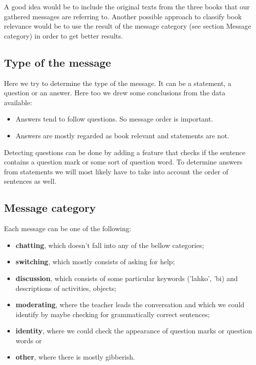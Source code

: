 \documentclass[11pt,a4paper]{article}
\begin{document}
A good idea would be to include the original texts from the three books that our gathered messages are referring to.
Another possible approach to classify book relevance would be to use the result of the message category (see section Message category) in order to get better results.

\subsection{Type of the message}
Here we try to determine the type of the message. 
It can be a statement, a question or an answer.
Here too we drew some conclusions from the data available:

\begin{itemize}
\item{Answers tend to follow questions. So message order is important.}
\item{Answers are mostly regarded as book relevant and statements are not.}
\end{itemize}

Detecting questions can be done by adding a feature that checks if the sentence contains a question mark or some sort of question word.
To determine answers from statements we will most likely have to take into account the order of sentences as well.

\subsection{Message category}

Each message can be one of the following:
\begin{itemize}
\item{\textbf{chatting}, which doesn't fall into any of the bellow categories;}
\item{\textbf{switching}, which mostly consists of asking for help;}
\item{\textbf{discussion}, which consists of some particular keywords ('lahko', 'bi) and descriptions of activities, objects;}
\item{\textbf{moderating}, where the teacher leads the conversation and which we could identify by maybe checking for grammatically correct sentences;}
\item{\textbf{identity}, where we could check the appearance of question marks or question words or}
\item{\textbf{other}, where there is mostly gibberish.}
\end{itemize}
\end{document}

